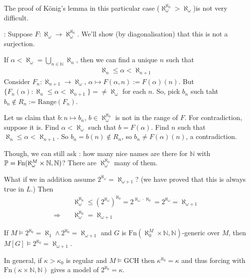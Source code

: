\documentclass[12pt,a4paper]{article}
\newenvironment{subproof}
{\begin{changemargin}{0.5cm}{0.5cm} 
	}%
	{\end{changemargin}
}
\begin{document}
\begin{itemize}
The proof of K\"onig's lemma in this particular case ($\aleph_{\omega}^{\aleph_0} > \aleph_{\omega}$)is not very difficult.
\begin{subproof}
: Suppose $F: \aleph_{\omega} \rightarrow \aleph_{\omega}^{\aleph_0}$. We'll show (by diagonalisation) that this is not a surjection.

\quad If $\alpha < \aleph_{\omega} = \bigcup_{n\in \mathbb{N}}\aleph_n$, then we can find a unique $n$ such that
\begin{align*}
\aleph_n \leq \alpha < \aleph_{n+1}
\end{align*}
Consider $F_n : \aleph_{n+1} \rightarrow \aleph_{\omega}$, $\alpha \mapsto F(\alpha, n) := F(\alpha)(n)$. But $\{F_n(\alpha)  : \aleph_n \leq \alpha < \aleph_{n+1}\} =\neq \aleph_{\omega}$ for each $n$. So, pick $b_n$ such taht $b_n \not\in R_n := \text{Range}(F_n)$.

\quad Let us claim that $b: n\mapsto b_n$, $b\in \aleph_{\omega}^{\aleph_0}$ is not in the range of $F$. For contradiction, suppose it is. Find $\alpha < \aleph_{\omega}$ such that $b= F(\alpha)$. Find $n$ such that $\aleph_n \leq \alpha < \aleph_{n+1}$. So $b_n = b(n) \not\in R_n$, so $b_n \neq F(\alpha)(n)$, a contradiction.
\end{subproof}
\s

Though, we can still ask : how many nice names are there for $\mathbb{N}$ with $\mathbb{P} =\text{Fn}(\aleph_{\omega}^M \times \mathbb{N}, \mathbb{N})$? There are $\aleph_{\omega}^{\aleph_0}$ many of them.

\quad What if we in addition assume $2^{\aleph_{\omega}} = \aleph_{\omega+1}$? (we have proved that this is always true in $L$.) Then
\begin{align*}
& \aleph_{\omega}^{\aleph_0} \leq (2^{\aleph_{\omega}})^{\aleph_0} = 2^{\aleph_{\omega} \cdot \aleph_0} = 2^{\aleph_{\omega}} = \aleph_{\omega+1} \\
\Rightarrow \quad & \aleph_{\omega}^{\aleph_0} = \aleph_{\omega +1}
\end{align*}

\corr If $M\models 2^{\aleph_0} = \aleph_1 \wedge 2^{\aleph_0} = \aleph_{\omega+1}$ and $G$ is $\text{Fn}(\aleph_0^M \times \mathbb{N}, \mathbb{N})$-generic over $M$, then $M[G] \models 2^{\aleph_0} = \aleph_{\omega+1}$.

\quad In general, if $\kappa> \kappa_0$ is regular and $M\models \text{GCH}$ then $\kappa^{\aleph_0} = \kappa$ and thus forcing with $\text{Fn}(\kappa \times \mathbb{N}, \mathbb{N})$ gives a model of $2^{\aleph_0} = \kappa$.


\end{itemize}
\end{document}
